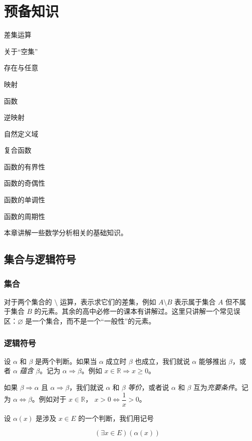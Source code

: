 \documentclass[lang=cn,10pt]{elegantbook}
\begin{document}
\chapter{预备知识}
\begin{introduction}
  \item 差集运算
  \item 关于“空集”
  \item 存在与任意
  \item 映射
  \item 函数
  \item 逆映射
  \item 自然定义域
  \item 复合函数
  \item 函数的有界性
  \item 函数的奇偶性
  \item 函数的单调性
  \item 函数的周期性
\end{introduction}
本章讲解一些数学分析相关的基础知识。

\section{集合与逻辑符号}

\subsection{集合}
对于两个集合的 $\setminus$ 运算，表示求它们的差集，例如 $A \setminus B$ 表示属于集合 $A$ 但不属于集合 $B$ 的元素。其余的高中必修一的课本有讲解过。这里只讲解一个常见误区：$\varnothing$ 是一个集合，而不是一个“一般性”的元素。

\subsection{逻辑符号}
设 $\alpha$ 和 $\beta$ 是两个判断。如果当 $\alpha$ 成立时 $\beta$ 也成立，我们就说 $\alpha$ 能够推出 $\beta$，或者 $\alpha$ \emph{蕴含} $\beta$。记为 $\alpha \Rightarrow \beta$。例如 $x \in \mathbb{R} \Rightarrow x \geq 0$。

如果 $\beta\Rightarrow\alpha$ 且 $\alpha\Rightarrow\beta$，我们就说 $\alpha$ 和 $\beta$ \emph{等价}，或者说 $\alpha$ 和 $\beta$ 互为\emph{充要条件}。记为 $\alpha \Leftrightarrow \beta$。例如对于 $x \in \mathbb{R}$， $x > 0 \Leftrightarrow \dfrac 1x > 0$。

设 $\alpha(x)$ 是涉及 $x \in E$ 的一个判断，我们用记号

\begin{equation*}
  (\exists x \in E)(\alpha(x))
\end{equation*}
\end{document}
